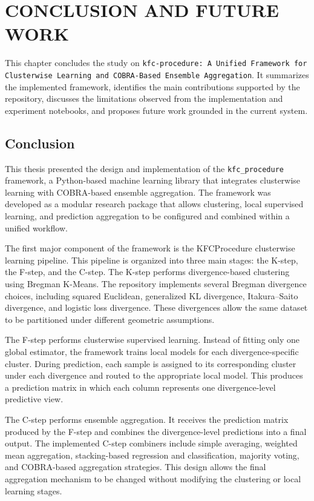 \chapter{CONCLUSION AND FUTURE WORK}
\label{ch:conclusion_future_work}

This chapter concludes the study on \texttt{kfc-procedure: A Unified Framework for Clusterwise Learning and COBRA-Based Ensemble Aggregation}. It summarizes the implemented framework, identifies the main contributions supported by the repository, discusses the limitations observed from the implementation and experiment notebooks, and proposes future work grounded in the current system.

\section{Conclusion}
\label{sec:conclusion}

This thesis presented the design and implementation of the \texttt{kfc\_procedure} framework, a Python-based machine learning library that integrates clusterwise learning with COBRA-based ensemble aggregation. The framework was developed as a modular research package that allows clustering, local supervised learning, and prediction aggregation to be configured and combined within a unified workflow.

The first major component of the framework is the KFCProcedure clusterwise learning pipeline. This pipeline is organized into three main stages: the K-step, the F-step, and the C-step. The K-step performs divergence-based clustering using Bregman K-Means. The repository implements several Bregman divergence choices, including squared Euclidean, generalized KL divergence, Itakura--Saito divergence, and logistic loss divergence. These divergences allow the same dataset to be partitioned under different geometric assumptions.

The F-step performs clusterwise supervised learning. Instead of fitting only one global estimator, the framework trains local models for each divergence-specific cluster. During prediction, each sample is assigned to its corresponding cluster under each divergence and routed to the appropriate local model. This produces a prediction matrix in which each column represents one divergence-level predictive view.

The C-step performs ensemble aggregation. It receives the prediction matrix produced by the F-step and combines the divergence-level predictions into a final output. The implemented C-step combiners include simple averaging, weighted mean aggregation, stacking-based regression and classification, majority voting, and COBRA-based aggregation strategies. This design allows the final aggregation mechanism to be changed without modifying the clustering or local learning stages.

